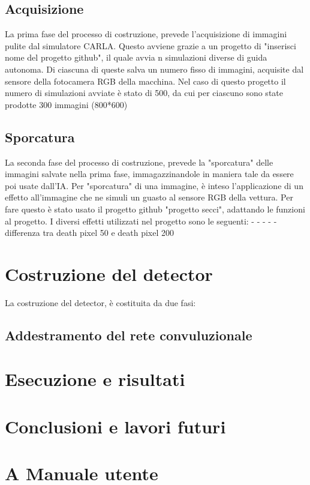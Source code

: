 \documentclass[14pt]{extarticle}
\begin{document}
\subsection{Acquisizione}
La prima fase del processo di costruzione, prevede l'acquisizione di immagini pulite dal simulatore CARLA. Questo avviene grazie a un progetto di "inserisci nome del progetto github", il quale avvia n simulazioni diverse di guida autonoma. Di ciascuna di queste salva un numero fisso di immagini, acquisite dal sensore della fotocamera RGB della macchina.
Nel caso di questo progetto il numero di simulazioni avviate è stato di 500, da cui per ciascuno sono state prodotte 300 immagini (800*600)
\subsection{Sporcatura}
La seconda fase del processo di costruzione, prevede la "sporcatura" delle immagini salvate nella prima fase, immagazzinandole in maniera tale da essere poi usate dall'IA.
Per "sporcatura" di una immagine, è inteso l'applicazione di un effetto all'immagine che ne simuli un guasto al sensore RGB della vettura.
Per fare questo è stato usato il progetto github "progetto secci", adattando le funzioni al progetto.
I diversi effetti utilizzati nel progetto sono le seguenti:
-
-
-
-
-
differenza tra death pixel 50 e death pixel 200 

\section{Costruzione del detector}
La costruzione del detector, è costituita da due fasi:
\subsection{Addestramento del rete convuluzionale}




\section{Esecuzione e risultati}

\section{Conclusioni e lavori futuri}

\section{A Manuale utente}
\end{document}
